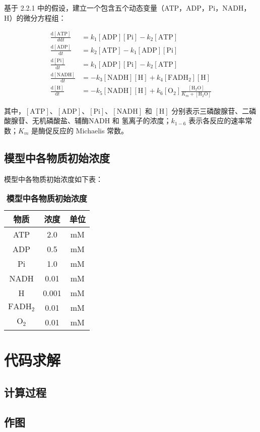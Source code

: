 \documentclass{ctexart}
\begin{document}
基于 2.2.1 中的假设，建立一个包含五个动态变量（ATP，ADP，Pi，NADH，H）的微分方程组：

$$
    \begin{aligned}
        \frac{\mathrm{d}[\text{ATP}]}{d\mathrm{d}t} & = k_{1}[\text{ADP}] [\text{Pi}] - k_2 [\text{ATP}]                                                             \\
        \frac{\mathrm{d}[\text{ADP}]}{\mathrm{d}t}  & = k_{2} [\text{ATP}] - k_{1} [\text{ADP}] [\text{Pi}]                                                          \\
        \frac{\mathrm{d}[\text{Pi}]}{\mathrm{d}t}   & = k_{1} [\text{ADP}] [\text{Pi}] - k_{2} [\text{ATP}]                                                          \\
        \frac{\mathrm{d}[\text{NADH}]}{\mathrm{d}t} & = -k_{3} [\text{NADH}] [\text{H}] + k_{4} [\text{FADH}_2] [\text{H}]                                           \\
        \frac{\mathrm{d}[\text{H}]}{\mathrm{d}t}    & = -k_{5} [\text{NADH}] [\text{H}] + k_{6} [\text{O}_2]\frac{ [\text{H}_2\text{O}]}{K_m + [\text{H}_2\text{O}]}
    \end{aligned}
$$

其中，$[\text{ATP}]$、$[\text{ADP}]$、$[\text{Pi}]$、$[\text{NADH}]$ 和 $[\text{H}]$ 分别表示三磷酸腺苷、二磷酸腺苷、无机磷酸盐、辅酶NADH 和 氢离子的浓度；$k_{1-6}$ 表示各反应的速率常数；$K_m$ 是酶促反应的 Michaelis 常数。

\subsection{模型中各物质初始浓度}
模型中各物质初始浓度如下表：


\begin{table}[H]
    \centering
    \begin{tabular}{ccc}
        \toprule%
        物质 & 浓度 & 单位\\
        \midrule%
        ATP & 2.0 & mM\\
        ADP & 0.5 & mM\\
        Pi & 1.0 & mM\\
        NADH & 0.01 & mM\\
        H & 0.001 & mM\\
        $\mathrm{FADH_2}$ & 0.01 & mM\\
        $\mathrm{O_2}$ & 0.01 & mM\\
        \bottomrule
    \end{tabular}
    \caption{\textbf{模型中各物质初始浓度}}
\end{table}

\section{代码求解}
\subsection{计算过程}
\subsection{作图}
\end{document}
